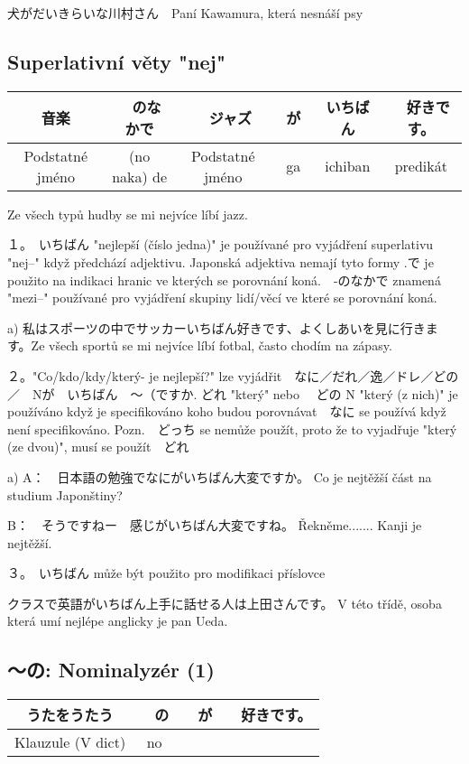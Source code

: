 犬がだいきらいな川村さん　Paní Kawamura, která nesnáší psy

\subsection{Superlativní věty "nej"}
\begin{center}
\begin{tabular}{||c|c||c|c||c||c||}
\hline
音楽&　のなかで&　ジャズ　&が　&いちばん&　好きです。\\
\hline
Podstatné jméno&(no naka) de& Podstatné jméno& ga& ichiban&predikát\\
\hline
\end{tabular}
\end{center}
Ze všech typů hudby se mi nejvíce líbí jazz.

１。　いちばん "nejlepší (číslo jedna)" je používané pro vyjádření superlativu "nej--" když předchází adjektivu. Japonská adjektiva nemají tyto formy .で je použito na indikaci hranic ve kterých se porovnání koná.　-のなかで znamená "mezi--" používané pro vyjádření skupiny lidí/věcí ve které se porovnání koná.

a) 私はスポーツの中でサッカーいちばん好きです、よくしあいを見に行きます。Ze všech sportů se mi nejvíce líbí fotbal, často chodím na zápasy.

２。"Co/kdo/kdy/který- je nejlepší?" lze vyjádřit　なに／だれ／逸／ドレ／どの／　Nが　いちばん　〜（ですか. どれ "který" nebo 　どの N "který (z nich)" je používáno když je specifikováno koho budou porovnávat　なに se používá když není specifikováno. Pozn.　どっち se nemůže použít, proto že to vyjadřuje "který (ze dvou)", musí se použít　どれ

a)
 A：　日本語の勉強でなにがいちばん大変ですか。  Co je nejtěžší část na studium Japonštiny?
 
B：　そうですねー　感じがいちばん大変ですね。 Řekněme....... Kanji je nejtěžší.


３。　いちばん může být použito pro modifikaci příslovce

クラスで英語がいちばん上手に話せる人は上田さんです。 V této třídě, osoba která umí nejlépe anglicky je pan Ueda.

\subsection*{〜の: Nominalyzér (1)}
\begin{center}
\begin{tabular}{||c|c|c||c||}
\hline
うたをうたう&　の&　が&　好きです。\\
\hline
Klauzule (V dict)&no&&\\
\hline
\end{tabular}
\end{center}

